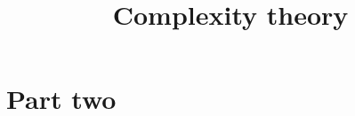 



\title{Complexity theory}


\maketitle

\label{section-phantom}

\tableofcontents


\part{Part two}
\label{two}







